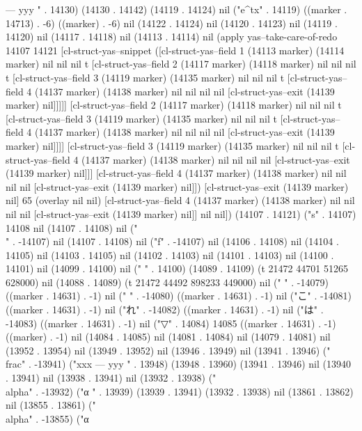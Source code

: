 ---
yyy
" . 14130) (14130 . 14142) (14119 . 14124) nil ("e^{tx}" . 14119) ((marker . 14713) . -6) ((marker) . -6) nil (14122 . 14124) nil (14120 . 14123) nil (14119 . 14120) nil (14117 . 14118) nil (14113 . 14114) nil (apply yas--take-care-of-redo 14107 14121 [cl-struct-yas--snippet ([cl-struct-yas--field 1 (14113 marker) (14114 marker) nil nil nil t [cl-struct-yas--field 2 (14117 marker) (14118 marker) nil nil nil t [cl-struct-yas--field 3 (14119 marker) (14135 marker) nil nil nil t [cl-struct-yas--field 4 (14137 marker) (14138 marker) nil nil nil nil [cl-struct-yas--exit (14139 marker) nil]]]]] [cl-struct-yas--field 2 (14117 marker) (14118 marker) nil nil nil t [cl-struct-yas--field 3 (14119 marker) (14135 marker) nil nil nil t [cl-struct-yas--field 4 (14137 marker) (14138 marker) nil nil nil nil [cl-struct-yas--exit (14139 marker) nil]]]] [cl-struct-yas--field 3 (14119 marker) (14135 marker) nil nil nil t [cl-struct-yas--field 4 (14137 marker) (14138 marker) nil nil nil nil [cl-struct-yas--exit (14139 marker) nil]]] [cl-struct-yas--field 4 (14137 marker) (14138 marker) nil nil nil nil [cl-struct-yas--exit (14139 marker) nil]]) [cl-struct-yas--exit (14139 marker) nil] 65 (overlay nil nil) [cl-struct-yas--field 4 (14137 marker) (14138 marker) nil nil nil nil [cl-struct-yas--exit (14139 marker) nil]] nil nil]) (14107 . 14121) ("s" . 14107) 14108 nil (14107 . 14108) nil ("\\" . -14107) nil (14107 . 14108) nil ("f" . -14107) nil (14106 . 14108) nil (14104 . 14105) nil (14103 . 14105) nil (14102 . 14103) nil (14101 . 14103) nil (14100 . 14101) nil (14099 . 14100) nil (" " . 14100) (14089 . 14109) (t 21472 44701 51265 628000) nil (14088 . 14089) (t 21472 44492 898233 449000) nil ("
" . -14079) ((marker . 14631) . -1) nil (" " . -14080) ((marker . 14631) . -1) nil ("こ" . -14081) ((marker . 14631) . -1) nil ("れ" . -14082) ((marker . 14631) . -1) nil ("は" . -14083) ((marker . 14631) . -1) nil ("▽" . 14084) 14085 ((marker . 14631) . -1) ((marker) . -1) nil (14084 . 14085) nil (14081 . 14084) nil (14079 . 14081) nil (13952 . 13954) nil (13949 . 13952) nil (13946 . 13949) nil (13941 . 13946) ("\\frac" . -13941) ("xxx
---
yyy
" . 13948) (13948 . 13960) (13941 . 13946) nil (13940 . 13941) nil (13938 . 13941) nil (13932 . 13938) ("\\alpha" . -13932) ("α
" . 13939) (13939 . 13941) (13932 . 13938) nil (13861 . 13862) nil (13855 . 13861) ("\\alpha" . -13855) ("α
